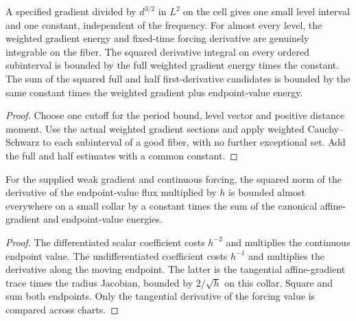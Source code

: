 \begin{lemma}
\label{lem:weighted-first-numerator-fiber-bounds}
\leanok
A specified gradient divided by $d^{3/2}$ in $L^2$ on the cell gives one
small level interval and one constant, independent of the frequency.
For almost every level, the weighted gradient energy and fixed-time forcing
derivative are genuinely integrable on the fiber. The squared derivative
integral on every ordered subinterval is bounded by the full weighted
gradient energy times the constant. The sum of the squared full and half
first-derivative candidates is bounded by the same constant times the
weighted gradient plus endpoint-value energy.
\end{lemma}
\begin{proof}
\leanok
Choose one cutoff for the period bound, level vector and positive distance
moment. Use the actual weighted gradient sections and apply weighted
Cauchy--Schwarz to each subinterval of a good fiber, with no further
exceptional set. Add the full and half estimates with a common constant.
\end{proof}

\begin{lemma}
\label{lem:numerator-endpoint-flux-energy}
\leanok
For the supplied weak gradient and continuous forcing, the squared norm of
the derivative of the endpoint-value flux multiplied by $h$ is bounded
almost everywhere on a small collar by a constant times the sum of the
canonical affine-gradient and endpoint-value energies.
\end{lemma}
\begin{proof}
\leanok
The differentiated scalar coefficient costs $h^{-2}$ and multiplies the
continuous endpoint value. The undifferentiated coefficient costs $h^{-1}$
and multiplies the derivative along the moving endpoint. The latter is the
tangential affine-gradient trace times the radius Jacobian, bounded by
$2/\sqrt h$ on this collar. Square and sum both endpoints. Only the
tangential derivative of the forcing value is compared across charts.
\end{proof}

